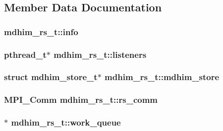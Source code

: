 \subsection{Member Data Documentation}
\hypertarget{structmdhim__rs__t_a23b6bfa000c31bbee0e71c4b6fbed2e9}{
\subsubsection[{info}]{ mdhim\-\_\-rs\-\_\-t\-::info}}\label{d3/d34/structmdhim__rs__t_a23b6bfa000c31bbee0e71c4b6fbed2e9}
\hypertarget{structmdhim__rs__t_ad4c630a210666a4711cec6f6378c333b}{
\subsubsection[{listeners}]{\setlength{\rightskip}{0pt plus 5cm}pthread\-\_\-t$\ast$ mdhim\-\_\-rs\-\_\-t\-::listeners}}\label{d3/d34/structmdhim__rs__t_ad4c630a210666a4711cec6f6378c333b}
\hypertarget{structmdhim__rs__t_aa393b01287a2253acff72c03cc5a83c5}{
\subsubsection[{mdhim\-\_\-store}]{\setlength{\rightskip}{0pt plus 5cm}struct {\bf mdhim\-\_\-store\-\_\-t}$\ast$ mdhim\-\_\-rs\-\_\-t\-::mdhim\-\_\-store}}\label{d3/d34/structmdhim__rs__t_aa393b01287a2253acff72c03cc5a83c5}
\hypertarget{structmdhim__rs__t_a0ed34bdf133e1d59d83d44d0fda49683}{
\subsubsection[{rs\-\_\-comm}]{\setlength{\rightskip}{0pt plus 5cm}M\-P\-I\-\_\-\-Comm mdhim\-\_\-rs\-\_\-t\-::rs\-\_\-comm}}\label{d3/d34/structmdhim__rs__t_a0ed34bdf133e1d59d83d44d0fda49683}
\hypertarget{structmdhim__rs__t_ab9b9e9145d08a9311917f42719937acc}{
\subsubsection[{work\-\_\-queue}]{$\ast$ mdhim\-\_\-rs\-\_\-t\-::work\-\_\-queue}}\label{d3/d34/structmdhim__rs__t_ab9b9e9145d08a9311917f42719937acc}
